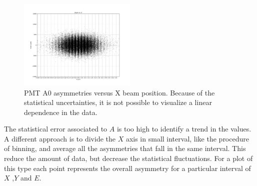 \begin{figure}[hbtp]
\centering
\includegraphics[width = 0.5\textwidth]{Analysis/Fit/A_vs_X.pdf}
\caption{PMT A0 asymmetries versus X beam position. Because of the statistical uncertainties, it is not possible to visualize a linear dependence in the data.}
\end{figure}

The statistical error associated to $A$ is too high to identify a trend in the values. A different approach is to divide the $X$ axis in small interval, like the procedure of binning, and average all the asymmetries that fall in the same interval. This reduce the amount of data, but decrease the statistical fluctuations. For a plot of this type each point represents the overall asymmetry for a particular interval of $X$ ,$Y$ and $E$.
 
